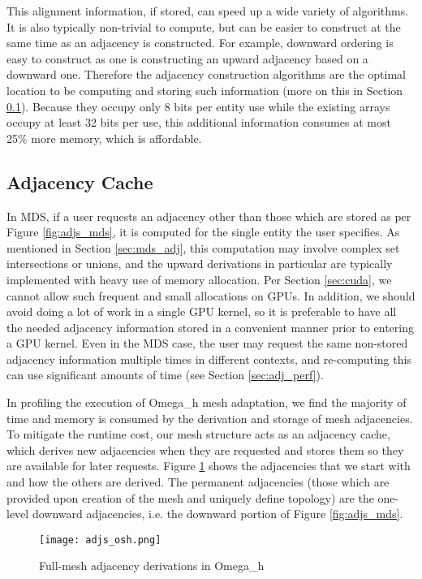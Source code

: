 This alignment information, if stored, can speed up a wide variety
of algorithms.
It is also typically non-trivial to compute, but can be easier
to construct at the same time as an adjacency is constructed.
For example, downward ordering is easy to construct as one
is constructing an upward adjacency based on a downward one.
Therefore the adjacency construction algorithms are the optimal
location to be computing and storing such information
(more on this in Section \ref{sec:adj_cache}).
Because they occupy only 8 bits per entity use while the
existing arrays occupy at least 32 bits per use, this additional
information consumes at most 25\% more memory, which is affordable.

\subsection{Adjacency Cache}
\label{sec:adj_cache}

In MDS, if a user requests an adjacency other than those
which are stored as per Figure \ref{fig:adjs_mds},
it is computed for the single entity the user specifies.
As mentioned in Section \ref{sec:mds_adj}, this computation
may involve complex set intersections or unions, and the
upward derivations in particular are typically implemented with
heavy use of memory allocation.
Per Section \ref{sec:cuda}, we cannot allow such frequent
and small allocations on GPUs.
In addition, we should avoid doing a lot of work in a single GPU kernel,
so it is preferable to have all the needed adjacency information stored in
a convenient manner prior to entering a GPU kernel.
Even in the MDS case, the user may request the same non-stored
adjacency information multiple times
in different contexts, and re-computing this can use significant
amounts of time (see Section \ref{sec:adj_perf}).

In profiling the execution of Omega\_h mesh adaptation, we find
the majority of time and memory is consumed by the
derivation and storage of mesh adjacencies.
To mitigate the runtime cost, our mesh structure acts as an adjacency cache,
which derives new adjacencies when they are requested and stores
them so they are available for later requests.
Figure \ref{fig:adjs_osh} shows the adjacencies that we start with
and how the others are derived.
The permanent adjacencies (those which are provided upon creation
of the mesh and uniquely define topology) are the one-level downward
adjacencies, i.e. the downward portion of Figure \ref{fig:adjs_mds}.

\begin{figure}
\begin{center}
\texttt{[image: adjs\_osh.png]}
\caption{Full-mesh adjacency derivations in Omega\_h}
\label{fig:adjs_osh}
\end{center}
\end{figure}

